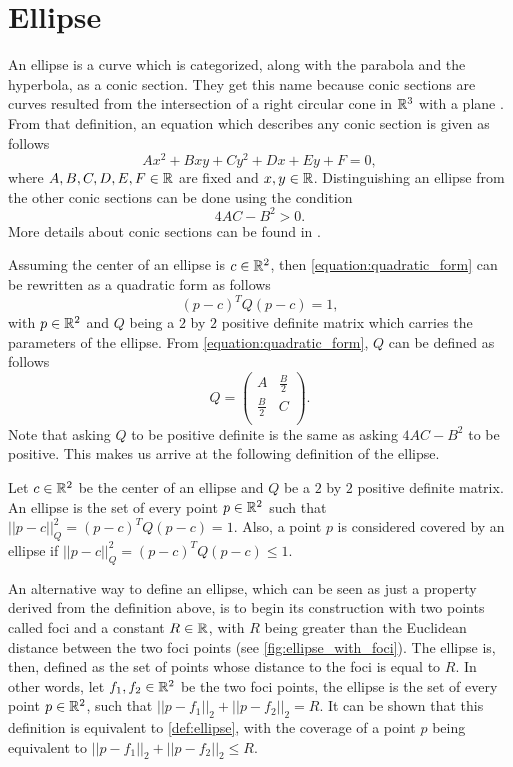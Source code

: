 \section{Ellipse}

An ellipse is a curve which is categorized, along with the parabola and the hyperbola, as a conic section. 
They get this name because conic sections are curves resulted from the intersection of a right circular cone in $\mathbb{R}^3$ with a plane \cite{brannan:geometry}. From that definition, an equation which describes any conic section is given as follows
\begin{equation}\label{equation:quadratic_form}
Ax^2 + Bxy + Cy^2 + Dx + Ey + F = 0,
\end{equation}
where $A,B,C,D,E,F \in \mathbb{R}$ are fixed and $x, y \in \mathbb{R}$. Distinguishing an ellipse from the other conic sections can be done using the condition
\begin{equation*}
4AC - B^2>0.
\end{equation*}
More details about conic sections can be found in .

Assuming the center of an ellipse is $c \in \mathbb{R}^2$, then \autoref{equation:quadratic_form} can be rewritten as a quadratic form as follows
\begin{equation*}
(p-c)^{T}Q(p-c) = 1,
\end{equation*}
with $p \in \mathbb{R}^2$ and $Q$ being a $2$ by $2$ positive definite matrix which carries the parameters of the ellipse. From \autoref{equation:quadratic_form}, $Q$ can be defined as follows
\[
Q=
\left( {\begin{array}{cc}
	A & \frac{B}{2} \\
	\frac{B}{2} & C \\
	\end{array} } \right).
\]
Note that asking $Q$ to be positive definite is the same as asking $4AC-B^2$ to be positive. This makes us arrive at the following definition of the ellipse.

\begin{definicao}\label{def:ellipse}
    Let $c\in \mathbb{R}^2$ be the center of an ellipse and $Q$ be a $2$ by $2$ positive definite matrix. An ellipse is the set of every point $p \in \mathbb{R}^2$ such that $||p-c||_{Q}^2 = (p-c)^{T}Q(p-c) = 1$. Also, a point $p$ is considered covered by an ellipse if $||p-c||_{Q}^2 = (p-c)^{T}Q(p-c) \le 1$.
\end{definicao}

An alternative way to define an ellipse, which can be seen as just a property derived from the definition above, is to begin its construction with two points called foci and a constant $R \in \mathbb{R}$, with $R$ being greater than the Euclidean distance between the two foci points (see \autoref{fig:ellipse_with_foci}). The ellipse is, then, defined as the set of points whose distance to the foci is equal to $R$. In other words, let $f_1, f_2 \in \mathbb{R}^2$ be the two foci points, the ellipse is the set of every point $p \in \mathbb{R}^2$, such that $||p-f_1||_2 + ||p-f_2||_2 = R$. It can be shown that this definition is equivalent to \autoref{def:ellipse}, with the coverage of a point $p$ being equivalent to $||p-f_1||_2 + ||p-f_2||_2 \le R$.

